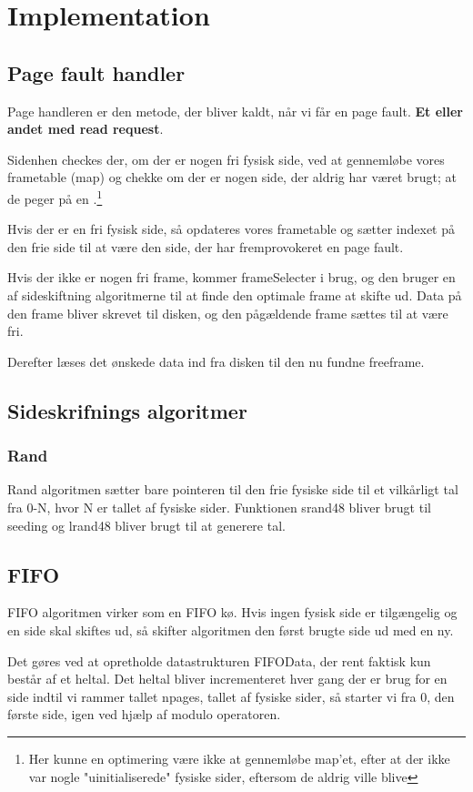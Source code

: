 \section{Implementation}

\subsection{Page fault handler}
Page handleren er den metode, der bliver kaldt, når vi får en page fault. \textbf{Et eller andet med read request}.

Sidenhen checkes der, om der er nogen fri fysisk side, ved at gennemløbe vores frametable (map) og chekke om der er nogen side, der aldrig har været brugt; at de peger på en .\footnote{Her kunne en optimering være ikke at gennemløbe map'et, efter at der ikke var nogle "uinitialiserede" fysiske sider, eftersom de aldrig ville blive} 

Hvis der er en fri fysisk side, så opdateres vores frametable og sætter indexet på den frie side til at være den side, der har fremprovokeret en page fault.

Hvis der ikke er nogen fri frame, kommer frameSelecter i brug, og den bruger en af sideskiftning algoritmerne til at finde den optimale frame at skifte ud. Data på den frame bliver skrevet til disken, og den pågældende frame sættes til at være fri. 

Derefter læses det ønskede data ind fra disken til den nu fundne freeframe.

\subsection{Sideskrifnings algoritmer}


\subsubsection{Rand}
Rand algoritmen sætter bare pointeren til den frie fysiske side til et vilkårligt tal fra 0-N, hvor N er tallet af fysiske sider. Funktionen srand48 bliver brugt til seeding og lrand48 bliver brugt til at generere tal.

\subsection{FIFO}
FIFO algoritmen virker som en FIFO kø. Hvis ingen fysisk side er tilgængelig og en side skal skiftes ud, så skifter algoritmen den først brugte side ud med en ny.

Det gøres ved at opretholde datastrukturen FIFOData, der rent faktisk kun består af et heltal. Det heltal bliver incrementeret hver gang der er brug for en side indtil vi rammer tallet npages, tallet af fysiske sider, så starter vi fra 0, den første side, igen ved hjælp af modulo operatoren. 